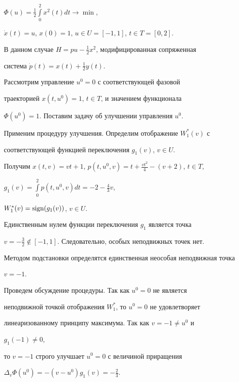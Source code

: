 \begin{exam} 


$\Phi(u)=\frac{1}{2}\int\limits^2_0x^2(t)d t\to\min$, 


$\Dot x(t)=u$, $x(0)=1$, $u\in U=[-1,1]$, $t\in T=[0,2]$. 


 


В данном случае $H=p u-\frac{1}{2}x^2$, модифицированная сопряженная 


система $\Dot p(t)=x(t)+\frac{1}{2}y(t)$. 


 


Рассмотрим управление $u^0=0$ с соответствующей фазовой 


траекторией $x(t,u^0)=1$, $t\in T$, и значением функционала 


$\Phi(u^0)=1$. Поставим задачу об улучшении управления $u^0$. 


 


Применим процедуру улучшения. Определим отображение $W^*_1(v)$ с 


соответствующей функцией переключения $g_1(v)$, $v\in U$. 


Получим $x(t,v)=v t+1$, $p(t,u^0,v)=t+\frac{v t^2}{4}-(v+2)$, $t\in T$, 


$g_1(v)=\int\limits^2_0p(t,u^0,v)d t=-2-\frac{4}{3}v$, 


$W^*_1(v)=\operatorname{sign}(g_1(v))$, $v\in U$. 


 


Единственным нулем функции переключения $g_1$ является точка 


$v=-\frac{3}{2}\notin[-1,1]$. Следовательно, особых неподвижных точек нет. 


Методом подстановки определятся единственная неособая неподвижная точка 


$v=-1$. 


 


Проведем обсуждение процедуры. Так как $u^0=0$ не является 


неподвижной точкой отображения $W^*_1$, то $u^0=0$ не удовлетворяет 


линеаризованному принципу максимума. Так как $v=-1\ne u^0$ и 


$g_1(-1)\ne0$, 


то $v=-1$ строго улучшает $u^0=0$ с величиной приращения 


$\Delta_v\Phi(u^0)=-(v-u^0)g_1(v)=-\frac{2}{3}$. 


\end{exam} 


